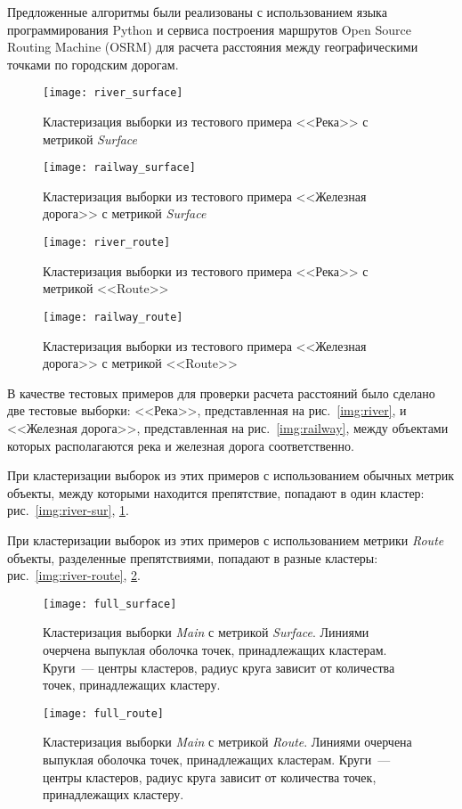 Предложенные алгоритмы были реализованы с использованием языка программирования Python и сервиса построения маршрутов Open Source Routing Machine (OSRM) для расчета расстояния между географическими точками по городским дорогам.

\begin{figure}[t!]
    \centering
    \texttt{[image: river\_surface]}\\[1ex]
    \parbox{.9\textwidth}{\caption{Кластеризация выборки из тестового примера <<Река>> с метрикой \emph{Surface}} \label{img:river-sur}}
    \texttt{[image: railway\_surface]}\\[1ex]
    \parbox{.9\textwidth}{\caption{Кластеризация выборки из тестового примера <<Железная дорога>> с метрикой \emph{Surface}} \label{img:railway-sur}}
\end{figure}

\begin{figure}[t!]
    \centering
    \texttt{[image: river\_route]}\\[1ex]
    \parbox{.9\textwidth}{\caption{Кластеризация выборки из тестового примера <<Река>> с метрикой <<Route>>} \label{img:river-route}}
    \texttt{[image: railway\_route]}\\[1ex]
    \parbox{.9\textwidth}{\caption{Кластеризация выборки из тестового примера <<Железная дорога>> с метрикой <<Route>>} \label{img:railway-route}}
\end{figure}

В качестве тестовых примеров для проверки расчета расстояний было сделано две тестовые выборки: <<Река>>, представленная на рис.~\ref{img:river}, и <<Железная дорога>>, представленная на рис.~\ref{img:railway}, между объектами которых располагаются река и железная дорога соответственно.

При кластеризации выборок из этих примеров с использованием обычных метрик объекты, между которыми находится препятствие, попадают в один кластер: рис.~\ref{img:river-sur}, \ref{img:railway-sur}.

При кластеризации выборок из этих примеров с использованием метрики \emph{Route} объекты, разделенные препятствиями, попадают в разные кластеры: рис.~\ref{img:river-route}, \ref{img:railway-route}.
\begin{figure}[b!]
    \centering
    \texttt{[image: full\_surface]}\\[1ex]
    \parbox{.9\textwidth}{\caption{Кластеризация выборки \emph{Main} с метрикой \emph{Surface}. Линиями очерчена выпуклая оболочка точек, принадлежащих кластерам. Круги~--- центры кластеров, радиус круга зависит от количества точек, принадлежащих кластеру.} \label{img:full-surface}}
    \texttt{[image: full\_route]}\\[1ex]
    \parbox{.9\textwidth}{\caption{Кластеризация выборки \emph{Main} с метрикой \emph{Route}. Линиями очерчена выпуклая оболочка точек, принадлежащих кластерам. Круги~--- центры кластеров, радиус круга зависит от количества точек, принадлежащих кластеру.} \label{img:full-route}}
\end{figure}

